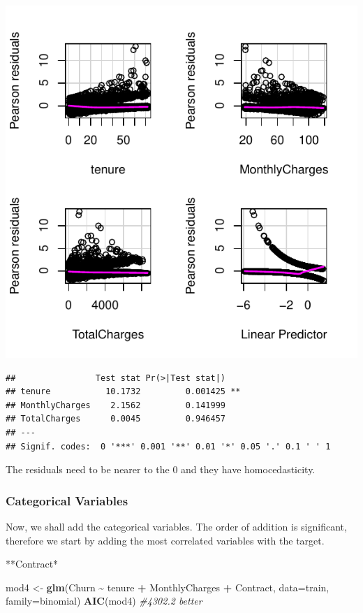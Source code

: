 \documentclass[
  twoside]{article}
\newenvironment{Shaded}{\begin{snugshade}}{\end{snugshade}}
\newcommand{\AttributeTok}[1]{\textcolor[rgb]{0.13,0.29,0.53}{#1}}
\newcommand{\CommentTok}[1]{\textcolor[rgb]{0.56,0.35,0.01}{\textit{#1}}}
\newcommand{\FunctionTok}[1]{\textcolor[rgb]{0.13,0.29,0.53}{\textbf{#1}}}
\newcommand{\NormalTok}[1]{#1}
\newcommand{\OtherTok}[1]{\textcolor[rgb]{0.56,0.35,0.01}{#1}}
\newcommand{\SpecialCharTok}[1]{\textcolor[rgb]{0.81,0.36,0.00}{\textbf{#1}}}
\begin{document}
\includegraphics{Assigment2_files/figure-latex/unnamed-chunk-54-1.pdf}

\begin{verbatim}
##                Test stat Pr(>|Test stat|)   
## tenure           10.1732         0.001425 **
## MonthlyCharges    2.1562         0.141999   
## TotalCharges      0.0045         0.946457   
## ---
## Signif. codes:  0 '***' 0.001 '**' 0.01 '*' 0.05 '.' 0.1 ' ' 1
\end{verbatim}

The residuals need to be nearer to the 0 and they have homocedasticity.

\hypertarget{categorical-variables}{%
\subsubsection{Categorical Variables}\label{categorical-variables}}

Now, we shall add the categorical variables. The order of addition is
significant, therefore we start by adding the most correlated variables
with the target.

**Contract*

\begin{Shaded}
\begin{Highlighting}[]
\NormalTok{mod4 }\OtherTok{\textless{}{-}} \FunctionTok{glm}\NormalTok{(Churn }\SpecialCharTok{\textasciitilde{}}\NormalTok{ tenure }\SpecialCharTok{+}\NormalTok{ MonthlyCharges }\SpecialCharTok{+}\NormalTok{ Contract, }\AttributeTok{data=}\NormalTok{train, }\AttributeTok{family=}\NormalTok{binomial)}
\FunctionTok{AIC}\NormalTok{(mod4) }\CommentTok{\#4302.2 better}
\end{Highlighting}
\end{Shaded}
\end{document}
